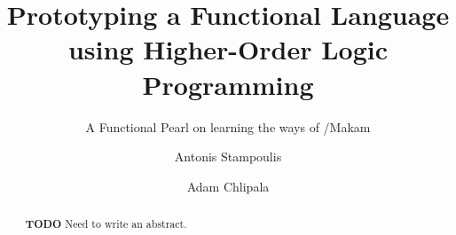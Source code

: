 \documentclass[format=acmlarge,review,anonymous]{acmart}\settopmatter{printfolios=true}
\begin{document}
\title{Prototyping a Functional Language using Higher-Order Logic Programming}
\subtitle{A Functional Pearl on learning the ways of \lamprolog/Makam}

\author{Antonis Stampoulis}

\author{Adam Chlipala}

\newcommand\TODO[0]{\textbf{TODO}}
\newcommand\lamprolog[0]{\foreignlanguage{greek}{λ}Prolog\xspace}
\newcommand\fomega[0]{F$\omega$\xspace}
\renewenvironment{verbatim}{\begin{quote}\begin{alltt}}{\end{alltt}\end{quote}}
\newenvironment{codequote}{\begin{quote}\begin{alltt}}{\end{alltt}\end{quote}}
\newcommand\hide[1]{}
\newcommand\tightlist[0]{\itemsep1pt\parskip0pt\parsep0pt}
\renewcommand\thesection{\textbf{CHAPTER \arabic{section}}}
\renewcommand\thesubsection{\textbf{SECTION \arabic{section}.\arabic{subsection}}}
\newcommand\hero[1]{\textit{#1}.}

\begin{abstract}
\TODO{} Need to write an abstract.
\end{abstract}


\end{document}

